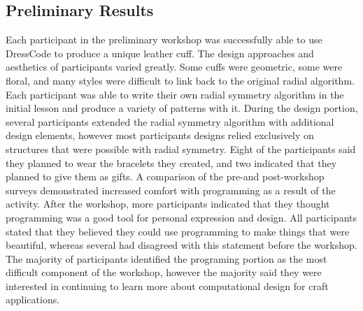 \documentclass{sigchi}
\begin{document}
\subsection{Preliminary Results}
Each participant in the preliminary workshop was successfully able to use DressCode to produce a unique leather cuff. The design approaches and aesthetics of participants varied greatly. Some cuffs were geometric, some were floral, and many styles were difficult to link back to the original radial algorithm. Each participant was able to write their own radial symmetry algorithm in the initial lesson and produce a variety of patterns with it. During the design portion, several participants extended the radial symmetry algorithm with additional design elements, however most participants designs relied exclusively on structures that were possible with radial symmetry. Eight of the participants said they planned to wear the bracelets they created, and two indicated that they planned to give them as gifts. A comparison of the
pre-and post-workshop surveys demonstrated increased comfort with programming as a result of the activity. After the workshop, more participants indicated that they thought programming was a good tool for personal expression and design. All participants stated that they believed they could use programming to make things that were beautiful, whereas several had disagreed with this statement before the workshop. The majority of participants identified the programing portion as the most difficult component of the workshop, however the majority said they were interested in continuing to learn more about computational design for craft applications. 
\end{document}

